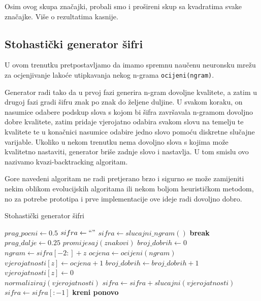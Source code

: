 \documentclass[a4paper,twocolumn]{article}
\begin{document}
Osim ovog skupa zna\v{c}ajki, probali smo i pro\v{s}ireni skup sa kvadratima
svake zna\v{c}ajke. Vi\v{s}e o rezultatima kasnije.

\subsection{Stohasti\v{c}ki generator \v{s}ifri}

U ovom trenutku pretpostavljamo da imamo spremnu nau\v{c}enu neuronsku
mre\v{z}u za ocjenjivanje lako\'ce utipkavanja nekog n-grama
\texttt{ocijeni(ngram)}. 

Generator radi tako da u prvoj fazi generira n-gram dovoljne kvalitete, a zatim
u drugoj fazi gradi \v{s}ifru znak po znak do \v{z}eljene duljine. U svakom
koraku, on nasumice odabere podskup slova s kojom bi \v{s}ifra zavr\v{s}avala
n-gramom dovoljno dobre kvalitete, zatim pridaje vjerojatno odabira svakom
slovu na temelju te kvalitete te u kona\v{c}nici nasumice odabire jedno slovo
pomo\'cu diskretne slu\v{c}ajne varijable. Ukoliko u nekom trenutku nema
dovoljno slova s kojima mo\v{z}e kvalitetno nastaviti, generator bri\v{s}e
zadnje slovo i nastavlja. U tom smislu ovo nazivamo kvazi-backtracking
algoritam.

Gore navedeni algoritam ne radi pretjerano brzo i sigurno se mo\v{z}e zamijeniti
nekim oblikom evolucijskih algoritama ili nekom boljom heuristi\v{c}kom metodom,
no za potrebe prototipa i prve implementacije ove ideje radi dovoljno dobro.

\clearpage
\begin{algorithm}
\caption{Stohasti\v{c}ki generator \v{s}ifri}
\label{alg1}
\begin{algorithmic}
    \State $prag\_pocni \leftarrow 0.5$
    \State $sifra \leftarrow ``"$
    \Loop
        \State $sifra \leftarrow slucajni\_ngram()$
        \State \textbf{break}
        \EndIf
    \EndLoop\\
    \State $prag\_dalje \leftarrow 0.25$
        \State $promijesaj(znakovi)$
        \State $broj\_dobrih \leftarrow 0$\\
            \State $ngram \leftarrow sifra[-2:] + z$
            \State $ocjena \leftarrow ocijeni(ngram)$\\
                \State $vjerojatnosti[z] \leftarrow ocjena + 1$
                \State $broj\_dobrih \leftarrow broj\_dobrih + 1$
            \Else
                \State $vjerojatnosti[z] \leftarrow 0$
            \EndIf
        \EndFor\\
        \State $normaliziraj(vjerojatnosti)$
            \State $sifra \leftarrow sifra + slucajni(vjerojatnosti)$
            \State $sifra \leftarrow sifra[:-1]$
        \Else
            \State \textbf{kreni ponovo}
        \EndIf
    \EndWhile
\end{algorithmic}
\end{algorithm}
\end{document}
